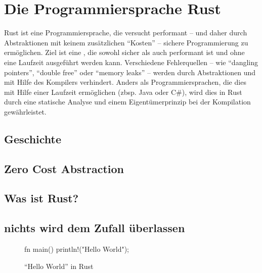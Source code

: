 
\chapter{Die Programmiersprache Rust}

Rust ist eine Programmiersprache, die versucht performant -- und daher durch Abstraktionen mit keinem zusätzlichen \enquote{Kosten}  -- sichere Programmierung zu ermöglichen.
Ziel ist eine , die sowohl sicher  als auch performant ist und ohne eine Laufzeit ausgeführt werden kann.
Verschiedene Fehlerquellen -- wie \enquote{dangling pointers}, \enquote{double free} oder \enquote{memory leaks}  --  werden durch Abstraktionen und mit Hilfe des Kompilers verhindert.
Anders als Programmiersprachen, die dies mit Hilfe einer Laufzeit ermöglichen (zbsp. Java oder C\#), wird dies in Rust durch eine statische Analyse und einem Eigentümerprinzip bei der Kompilation gewährleistet.


\section{Geschichte}



\section{Zero Cost Abstraction}

\section{Was ist Rust?}


\section{nichts wird dem Zufall überlassen}


\begin{wrapfigure}{r}{.5\textwidth}
	\begin{rustc}
		fn main() {
			println!("Hello World");
		}
	\end{rustc}
	\caption{\enquote{Hello World} in Rust}
	\label{fig:rust:hello_world}
\end{wrapfigure}


